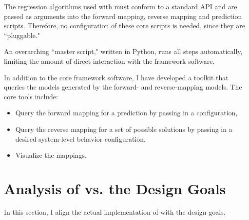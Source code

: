 The regression algorithms used with \fw must conform to a standard API
and are passed as arguments into the forward mapping, reverse mapping and prediction scripts.
Therefore, no configuration of these core scripts is needed, since they are ``pluggable."

An overarching ``master script," written in Python, runs all steps automatically, limiting the amount of direct interaction with the framework software.

In addition to the core framework software, I have developed a toolkit that queries the models generated by the forward- and reverse-mapping models.
The core tools include:
\begin{itemize}
   \item Query the forward mapping for a prediction by passing in a configuration,
   \item Query the reverse mapping for a set of possible solutions by passing in a desired system-level behavior configuration,
   \item Visualize the mappings.
\end{itemize}






\section{Analysis of \fw  vs. the Design Goals}
In this section, I align the actual implementation of \fw with the design goals.



